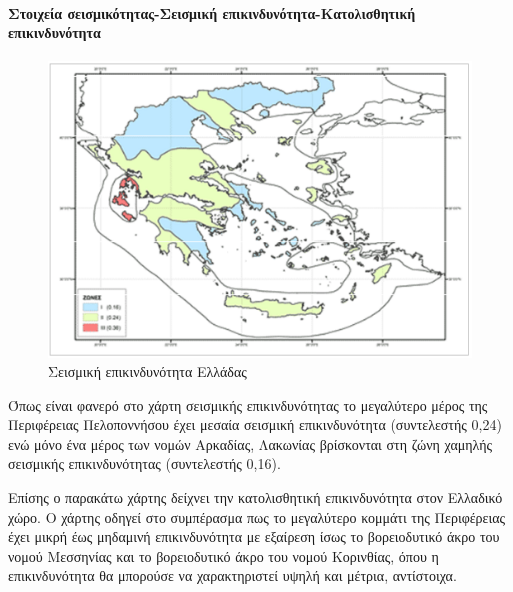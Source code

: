 \documentclass[12pt]{article}
\begin{document}
	\paragraph{Στοιχεία σεισμικότητας-Σεισμική επικινδυνότητα-Κατολισθητική επικινδυνότητα}
	
	\begin{figure} [H]
		\begin{center}
			\includegraphics [scale = 0.80] {seismiki.png}
			\caption{Σεισμική επικινδυνότητα Ελλάδας}
			\label{seismiki}
		\end{center}
	\end{figure}
	
	Όπως είναι φανερό στο χάρτη σεισμικής επικινδυνότητας το μεγαλύτερο μέρος της Περιφέρειας Πελοποννήσου έχει μεσαία σεισμική επικινδυνότητα (συντελεστής 0,24) ενώ μόνο ένα μέρος των νομών Αρκαδίας, Λακωνίας βρίσκονται στη ζώνη χαμηλής σεισμικής επικινδυνότητας (συντελεστής 0,16).
	
	Επίσης ο παρακάτω χάρτης δείχνει την κατολισθητική επικινδυνότητα στον Ελλαδικό χώρο. Ο χάρτης οδηγεί στο συμπέρασμα πως το μεγαλύτερο κομμάτι της Περιφέρειας έχει μικρή έως μηδαμινή επικινδυνότητα με εξαίρεση ίσως το βορειοδυτικό άκρο του νομού Μεσσηνίας και το βορειοδυτικό άκρο του νομού Κορινθίας, όπου η επικινδυνότητα θα μπορούσε να χαρακτηριστεί υψηλή και μέτρια, αντίστοιχα.
	
\end{document}

